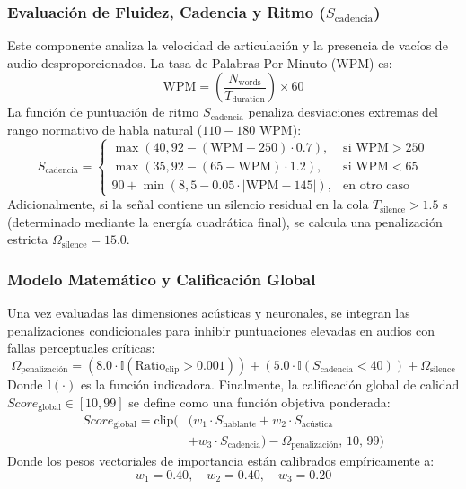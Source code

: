\documentclass[conference]{IEEEtran}
\begin{document}
\subsubsection{Evaluación de Fluidez, Cadencia y Ritmo ($S_{\text{cadencia}}$)}
Este componente analiza la velocidad de articulación y la presencia de vacíos de audio desproporcionados. La tasa de Palabras Por Minuto ($\text{WPM}$) es:
\begin{equation}
	\text{WPM} = \left( \frac{N_{\text{words}}}{T_{\text{duration}}} \right) \times 60
\end{equation}
La función de puntuación de ritmo $S_{\text{cadencia}}$ penaliza desviaciones extremas del rango normativo de habla natural ($110 - 180 \text{ WPM}$):
\begin{equation}
	S_{\text{cadencia}} = \begin{cases} 
		\max\left(40, 92 - (\text{WPM} - 250) \cdot 0.7\right), & \text{si } \text{WPM} > 250 \\ 
		\max\left(35, 92 - (65 - \text{WPM}) \cdot 1.2\right), & \text{si } \text{WPM} < 65 \\ 
		90 + \min\left(8, 5 - 0.05 \cdot |\text{WPM} - 145|\right), & \text{en otro caso} 
	\end{cases}	
\end{equation}
Adicionalmente, si la señal contiene un silencio residual en la cola $T_{\text{silence}} > 1.5 \text{ s}$ (determinado mediante la energía cuadrática final), se calcula una penalización estricta $\Omega_{\text{silence}} = 15.0$.

\subsubsection{Modelo Matemático y Calificación Global}
Una vez evaluadas las dimensiones acústicas y neuronales, se integran las penalizaciones condicionales para inhibir puntuaciones elevadas en audios con fallas perceptuales críticas:
\begin{equation}
	\Omega_{\text{penalización}} = \left( 8.0 \cdot \mathbb{I}(\text{Ratio}_{\text{clip}} > 0.001) \right) + \left( 5.0 \cdot \mathbb{I}(S_{\text{cadencia}} < 40) \right) + \Omega_{\text{silence}}
\end{equation}
Donde $\mathbb{I}(\cdot)$ es la función indicadora. Finalmente, la calificación global de calidad $Score_{\text{global}} \in [10, 99]$ se define como una función objetiva ponderada:
\begin{equation}
	\begin{split}
		Score_{\text{global}} = \text{clip}\Big( &\big(w_1 \cdot S_{\text{hablante}} + w_2 \cdot S_{\text{acústica}} \\
		&+ w_3 \cdot S_{\text{cadencia}}\big) - \Omega_{\text{penalización}}, \, 10, \, 99 \Big)
	\end{split}
\end{equation}
Donde los pesos vectoriales de importancia están calibrados empíricamente a:
\begin{equation}
	w_1 = 0.40, \quad w_2 = 0.40, \quad w_3 = 0.20
\end{equation}
\end{document}
